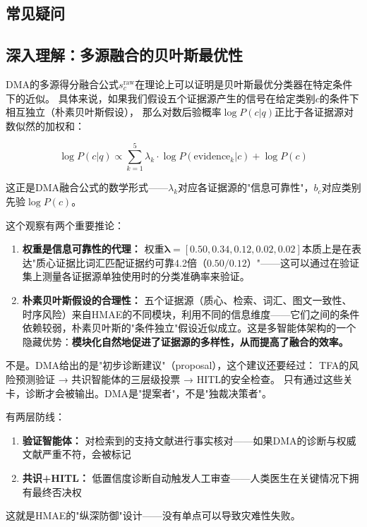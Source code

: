\documentclass[11pt,a4paper]{ctexart}
\begin{document}
\subsection{常见疑问}
\subsection{深入理解：多源融合的贝叶斯最优性}

DMA的多源得分融合公式$s_c^{\text{raw}}$在理论上可以证明是贝叶斯最优分类器在特定条件下的近似。
具体来说，如果我们假设五个证据源产生的信号在给定类别$c$的条件下相互独立（朴素贝叶斯假设），
那么对数后验概率$\log P(c|q)$正比于各证据源对数似然的加权和：

$$\log P(c|q) \propto \sum_{k=1}^{5} \lambda_k \cdot \log P(\text{evidence}_k | c) + \log P(c)$$

这正是DMA融合公式的数学形式——$\lambda_k$对应各证据源的"信息可靠性"，$b_c$对应类别先验$\log P(c)$。

这个观察有两个重要推论：
\begin{enumerate}[nosep]
\item \textbf{权重是信息可靠性的代理：} 权重$\boldsymbol{\lambda} = [0.50, 0.34, 0.12, 0.02, 0.02]$本质上是在表达"质心证据比词汇匹配证据约可靠4.2倍（$0.50/0.12$）"——这可以通过在验证集上测量各证据源单独使用时的分类准确率来验证。
\item \textbf{朴素贝叶斯假设的合理性：} 五个证据源（质心、检索、词汇、图文一致性、时序风险）来自HMAE的不同模块，利用不同的信息维度——它们之间的条件依赖较弱，朴素贝叶斯的"条件独立"假设近似成立。这是多智能体架构的一个隐藏优势：\textbf{模块化自然地促进了证据源的多样性，从而提高了融合的效率。}
\end{enumerate}




\begin{warnbox}
不是。DMA给出的是"初步诊断建议"（proposal），这个建议还要经过：
TFA的风险预测验证 → 共识智能体的三层级投票 → HITL的安全检查。
只有通过这些关卡，诊断才会被输出。DMA是"提案者"，不是"独裁决策者"。
\end{warnbox}

\begin{warnbox}
有两层防线：
\begin{enumerate}[nosep]
\item \textbf{验证智能体：} 对检索到的支持文献进行事实核对——如果DMA的诊断与权威文献严重不符，会被标记
\item \textbf{共识+HITL：} 低置信度诊断自动触发人工审查——人类医生在关键情况下拥有最终否决权
\end{enumerate}
这就是HMAE的"纵深防御"设计——没有单点可以导致灾难性失败。
\end{warnbox}
\end{document}
